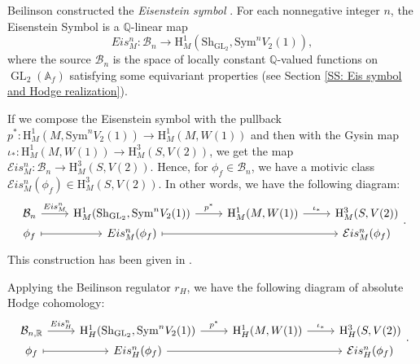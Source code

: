 \documentclass[11pt, a4paper]{amsart}
\theoremstyle{plain}
\theoremstyle{definition}
\numberwithin{equation}{section}
\def\AAA{\mathbb{A}}
\def\QQ{\mathbb{Q}}
\def\RR{\mathbb{R}}
\DeclareMathOperator{\GL}{\mathrm{GL}}
\newcommand{\Sh}{\mathrm{Sh}}
\begin{document}
Beilinson constructed the \emph{Eisenstein symbol} \cite[\S 3]{Beilinson_Modular_Curve}. For each nonnegative integer $n$, the Eisenstein Symbol is a $\QQ$-linear map
\[
    Eis^{n}_{M} \colon \mathcal{B}_{n} \rightarrow \mathrm{H}^{1}_{M}(\Sh_{\GL_2},\mathrm{Sym}^{n} V_2(1)), 
\]
where the source $\mathcal{B}_n$ is the space of locally constant $\QQ$-valued functions on $\GL_2(\AAA_{f})$ satisfying some equivariant properties (see Section \ref{SS: Eis symbol and Hodge realization}). 

\par If we compose the Eisenstein symbol with the pullback $p^{*}\colon \mathrm{H}^{1}_{M}(M,\mathrm{Sym}^{n} V_2(1)) \rightarrow \mathrm{H}^{1}_{M}(M, W(1))$ and then with the Gysin map $\iota_{*}\colon \mathrm{H}^{1}_{M}(M, W(1)) \rightarrow \mathrm{H}^{3}_{M}(S, V(2))$,  we get the map $\mathcal{E}is^{n}_{M}\colon \mathcal{B}_{n} \rightarrow \mathrm{H}^{3}_{M}(S, V(2))$. Hence, for $\phi_{f} \in \mathcal{B}_{n}$, we have a motivic class $\mathcal{E}is_{M}^{n}(\phi_f) \in \mathrm{H}^{3}_{M}(S, V(2))$. In other words, we have the following diagram: 
\[
    \begin{tikzcd}[row sep = 0]
        \mathcal{B}_n \ar[r, "{Eis^n_M}"] & \mathrm{H}^{1}_{M}(\Sh_{\GL_2}, \mathrm{Sym}^{n}V_2(1))  \ar[r, "{p^{*}}"] & \mathrm{H}^{1}_{M}(M, W(1)) \ar[r, "{\iota_{*}}"] & \mathrm{H}^{3}_{M}(S,V(2)) \\
        \phi_f \ar[r, mapsto] & Eis^n_M(\phi_f) \ar[rr, mapsto] & & \mathcal{E}is^{n}_{M}(\phi_f) 
    \end{tikzcd}. 
\]
This construction has been given in \cite[Definition 9.2.3]{LSZ22}. 
\par Applying the Beilinson regulator $r_{H}$, we have the following diagram of absolute Hodge cohomology: 
\begin{equation*}
         \begin{tikzcd}[row sep = 0]
        \mathcal{B}_{n, \RR} \ar[r, "{Eis^n_H}"] & \mathrm{H}^{1}_{H}(\Sh_{\GL_2}, \mathrm{Sym}^{n}V_2(1))  \ar[r, "{p^{*}}"] & \mathrm{H}^{1}_{H}(M, W(1)) \ar[r, "{\iota_{*}}"] & \mathrm{H}^{3}_{H}(S,V(2)) \\
        \phi_f \ar[r, mapsto] & Eis^n_H(\phi_f) \ar[rr] & & \mathcal{E}is^{n}_{H}(\phi_f) 
    \end{tikzcd}.
\end{equation*}
\end{document}
